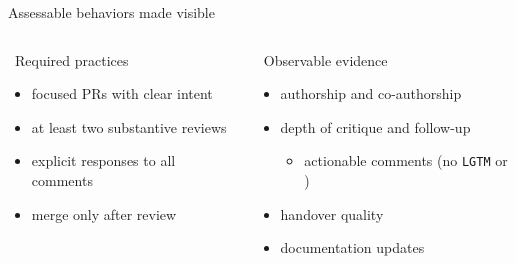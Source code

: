 \documentclass[
    NAME={Dr. Helga Ingimundardóttir},
    EMAIL={helgaingim@hi.is},
    FACULTY={Industrial Engineering},
    TITLE={Using Pull Requests to Make Collaboration Visible in CDIO Project-Based Courses},
    SEMINAR={22\textsuperscript{nd} International CDIO Conference},
    DATE={June 22\textsuperscript{nd} 2026},
    WIDE=true
]{HI-LaTeX/hi-beamer}
\begin{document}
\begin{frame}{Assessable behaviors made visible}
\begin{columns}[T,onlytextwidth]
\begin{column}{.48\textwidth}
\begin{block}{\faClipboardList~Required practices}
\begin{itemize}
    \item focused PRs with clear intent
    \item at least two substantive reviews
    \item explicit responses to all comments
    \item merge only after review
\end{itemize}
\end{block}
\end{column}
\begin{column}{.48\textwidth}
\begin{block}{\faUserCheck~Observable evidence}
\begin{itemize}
    \item authorship and co-authorship
    \item depth of critique and follow-up
    \begin{itemize}
        \item[\faGavel] actionable comments (no \texttt{LGTM} or \faThumbsUp)
    \end{itemize}
    \item handover quality
    \item documentation updates
\end{itemize}
\end{block}
\end{column}
\end{columns}
\centering\resizebox{.8\linewidth}{!}{}
\end{frame}
\end{document}
